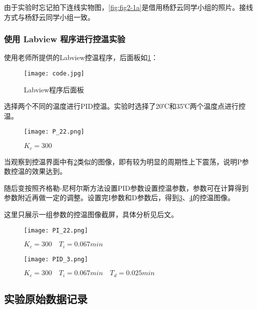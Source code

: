 \documentclass[dvipsnames, svgnames,a4paper,11pt]{article}
\begin{document}
        由于实验时忘记拍下连线实物图，\cref{fig:fig2-1a}是借用杨舒云同学小组的照片。接线方式与杨舒云同学小组一致。


	\subsubsection{使用 Labview 程序进行控温实验}

        使用老师所提供的Labview控温程序，后面板如\cref{fig:fig-code}：  

        \begin{figure}[htbp]
            \centering
            \texttt{[image: code.jpg]} 
            \caption{Labview程序后面板}
            \label{fig:fig-code}
        \end{figure}
    
        选择两个不同的温度进行PID控温。实验时选择了20℃和35℃两个温度点进行控温。

        \begin{figure}[htbp]
            \centering
            \texttt{[image: P\_22.png]} 
            \caption{$K_c = 300$}
            \label{fig:fig-P_22}
        \end{figure}

        当观察到控温界面中有\cref{fig:fig-P_22}类似的图像，即有较为明显的周期性上下震荡，说明P参数控温的效果达到。

        随后变按照齐格勒-尼柯尔斯方法设置PID参数设置控温参数，参数可在计算得到参数附近再做一定的调整。设置完I参数和D参数后，得到\cref{fig:fig-PI_22}、\cref{fig:fig-PID_3}的控温图像。

        这里只展示一组参数的控温图像截屏，具体分析见后文。

        \begin{figure}[htbp]
            \centering
            \texttt{[image: PI\_22.png]} 
            \caption{$K_c = 300 \quad T_i=0.067min$}
            \label{fig:fig-PI_22}
        \end{figure}

        \begin{figure}[htbp]
            \centering
            \texttt{[image: PID\_3.png]} 
            \caption{$K_c = 300 \quad T_i=0.067min \quad T_d=0.025min$}
            \label{fig:fig-PID_3}
        \end{figure}


\clearpage

\subsection{实验原始数据记录}
\end{document}

